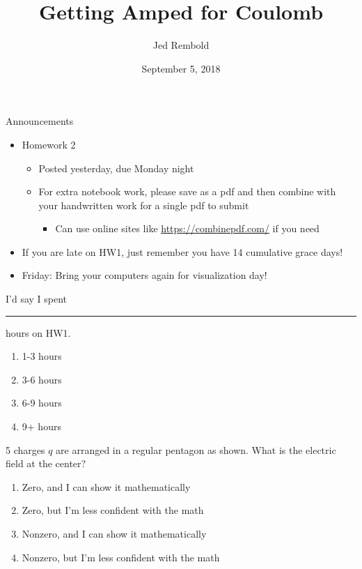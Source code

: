 \documentclass[pdf,aspectratio=169]{beamer}
\title{Getting Amped for Coulomb}
\date{September 5, 2018}
\author{Jed Rembold}
\begin{document}
\renewcommand{\theenumi}{\Alph{enumi}}

\begin{frame}{Announcements}
	\begin{itemize}
		\item Homework 2
			\begin{itemize}
				\item Posted yesterday, due Monday night
				\item For extra notebook work, please save as a pdf and then combine with your handwritten work for a single pdf to submit
					\begin{itemize}
						\item Can use online sites like \url{https://combinepdf.com/} if you need
					\end{itemize}
			\end{itemize}
		\item If you are late on HW1, just remember you have 14 cumulative grace days!
		\item Friday: Bring your computers again for visualization day!
	\end{itemize}
\end{frame}

\begin{frame}{}
	I'd say I spent \rule{1cm}{1pt} hours on HW1.
	\begin{enumerate}
		\item 1-3 hours
		\item 3-6 hours
		\item 6-9 hours
		\item 9+ hours
	\end{enumerate}
\end{frame}

\begin{frame}{}
	5 charges $q$ are arranged in a regular pentagon as shown. What is the electric field at the center?
	\begin{center}
	\end{center}
	\begin{enumerate}
		\item \alert<2>{Zero, and I can show it mathematically}
		\item Zero, but I'm less confident with the math
		\item Nonzero, and I can show it mathematically
		\item Nonzero, but I'm less confident with the math
	\end{enumerate}
\end{frame}
\end{document}

